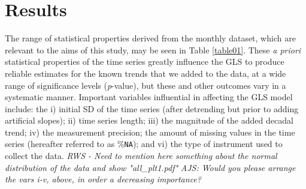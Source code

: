 \section{Results}
The range of statistical properties derived from the monthly dataset, which are relevant to the aims of this study, may be seen in Table \ref{table01}. These \emph{a priori} statistical properties of the time series greatly influence the GLS to produce reliable estimates for the known trends that we added to the data, at a wide range of significance levels (\emph{p}-value), but these and other outcomes vary in a systematic manner. Important variables influential in affecting the GLS model include: the i) initial SD of the time series (after detrending but prior to adding artificial slopes); ii) time series length; iii) the magnitude of the added decadal trend; iv) the measurement precision; the amount of missing values in the time series (hereafter referred to as \%\texttt{NA}); and vi) the type of instrument used to collect the data.
\emph{RWS - Need to mention here something about the normal distribution of the data and show "all_plt1.pdf"}
\emph{AJS: Would you please arrange the vars i-v, above, in order a decreasing importance?}


